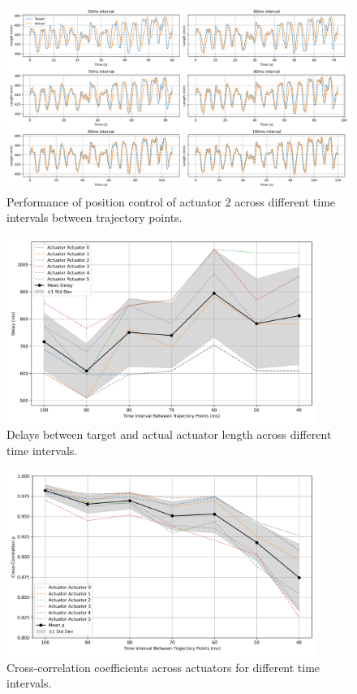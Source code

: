 \begin{figure}[H]
    \centering
    \includegraphics[width=\textwidth]{figures/actuator_2_trajectories.png}
    \caption{Performance of position control of actuator 2 across different time intervals between trajectory points.}
    \label{fig:position_control}
\end{figure}

\begin{figure}[H]
    \centering
    \includegraphics[width=0.9\textwidth]{figures/actuator_delays.png}
    \caption{Delays between target and actual actuator length across different time intervals.}
    \label{fig:actuator_delays_2}
\end{figure}

\begin{figure}[H]
    \centering
    \includegraphics[width=0.9\textwidth]{figures/actuator_rhos.png}
    \caption{Cross-correlation coefficients across actuators for different time intervals.}
    \label{fig:actuator_rhos_2}
\end{figure}

